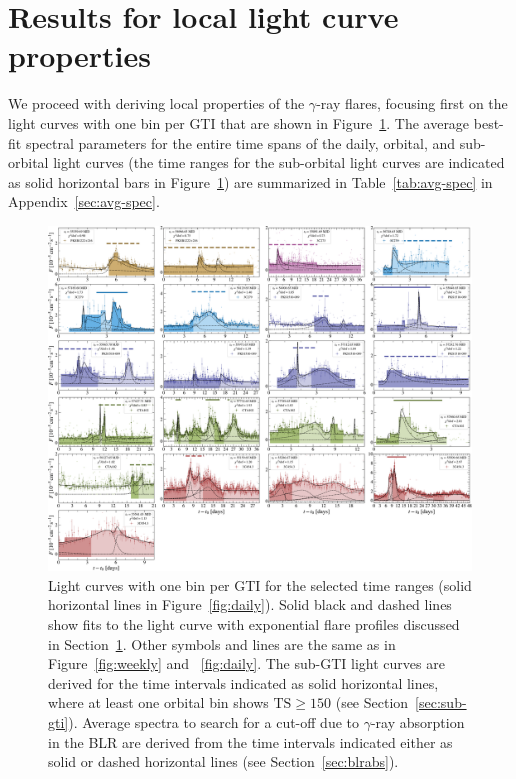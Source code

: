 \documentclass[twocolumn,linenumbers]{aastex62}
\newcommand{\gray}{$\gamma$-ray\xspace}
\begin{document}
\section{Results for local light curve properties}
\label{sec:results-local}

We proceed with deriving local properties of the \gray flares, focusing first on the light curves with one bin per GTI that are shown in Figure~\ref{fig:gti}.
The average best-fit spectral parameters for the entire time spans of the daily, orbital, and sub-orbital light curves (the time ranges for the sub-orbital light curves are indicated as solid horizontal bars in Figure~\ref{fig:gti}) are summarized in Table~\ref{tab:avg-spec} in Appendix~\ref{sec:avg-spec}. 

\begin{figure}
    \centering
    \includegraphics[width = .99\linewidth]{figures/lcfithop_orbit_all_maxiter2_fsys0p00_addcomp0_comb.pdf}
    \caption{ Light curves with one bin per GTI for the selected time ranges (solid horizontal lines in Figure~\ref{fig:daily}). Solid black and dashed lines show fits to the light curve with exponential flare profiles discussed in Section~\ref{sec:results-local}. Other symbols and lines are the same as in Figure~\ref{fig:weekly} and ~\ref{fig:daily}.
    The sub-GTI light curves are derived for the time intervals indicated as solid horizontal lines, where at least one orbital bin shows $\mathrm{TS}\geqslant 150$ (see Section~\ref{sec:sub-gti}). 
    Average spectra to search for a cut-off due to \gray absorption in the BLR are derived from the time intervals indicated either as solid or dashed horizontal lines (see Section~\ref{sec:blrabs}).
    }
    \label{fig:gti}
\end{figure}
\end{document}
